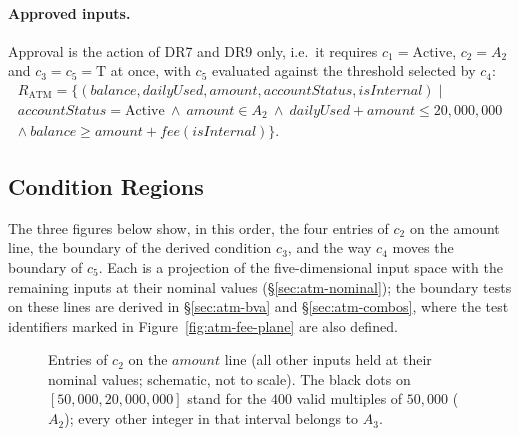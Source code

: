 \documentclass[11pt,a4paper]{article}
\begin{document}
\paragraph{Approved inputs.} Approval is the action of DR7 and DR9 only,
i.e.\ it requires \(c_1=\mathrm{Active}\), \(c_2=A_2\) and
\(c_3=c_5=\mathrm{T}\) at once, with \(c_5\) evaluated against the threshold
selected by \(c_4\):
\begin{multline*}
R_{\mathrm{ATM}}=\{(\mathit{balance},\mathit{dailyUsed},\mathit{amount},\mathit{accountStatus},\mathit{isInternal})\mid{}\\
\mathit{accountStatus}=\mathrm{Active}\ \wedge\ \mathit{amount}\in A_2
\ \wedge\ \mathit{dailyUsed}+\mathit{amount}\le 20{,}000{,}000\\
\wedge\ \mathit{balance}\ge \mathit{amount}+\mathit{fee}(\mathit{isInternal})\}.
\end{multline*}
\subsection{Condition Regions}
\label{sec:atm-regions}

The three figures below show, in this order, the four entries of \(c_2\) on
the amount line, the boundary of the derived condition \(c_3\), and the way
\(c_4\) moves the boundary of \(c_5\). Each is a projection of the
five-dimensional input space with the remaining inputs at their nominal
values (\S\ref{sec:atm-nominal}); the boundary tests on these lines are
derived in \S\ref{sec:atm-bva} and \S\ref{sec:atm-combos}, where the test identifiers marked in Figure~\ref{fig:atm-fee-plane} are also defined.

\begin{figure}[H]
\centering
{}
\caption{Entries of \(c_2\) on the \(\mathit{amount}\) line (all other inputs
held at their nominal values; schematic, not to scale). The black dots on
\([50{,}000,20{,}000{,}000]\) stand for the \(400\) valid multiples of
$50{,}000$ (\(A_2\)); every other integer in that interval belongs to
\(A_3\).}
\label{fig:atm-amount-line}
\end{figure}
\end{document}
